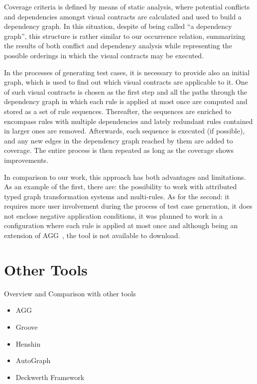 Coverage criteria is defined by means of static analysis, where potential conflicts and dependencies amongst visual contracts are calculated and used to build a dependency graph. In this situation, despite of being called ``a dependency graph'', this structure is rather similar to our occurrence relation, summarizing the results of both conflict and dependency analysis while representing the possible orderings in which the visual contracts may be executed.

In the processes of generating test cases, it is necessary to provide also an initial graph, which is used to find out which visual contracts are applicable to it. One of such visual contracts is chosen as the first step and all the paths through the dependency graph in which each rule is applied at most once are computed and stored as a set of rule sequences. Thereafter, the sequences are enriched to encompass rules with multiple dependencies and lately redundant rules contained in larger ones are
removed. Afterwards, each sequence is executed (if possible), and any new edges in the dependency graph reached by them are added to coverage. The entire process is then repeated as long as the coverage shows improvements. 

In comparison to our work, this approach has both advantages and limitations. As an example of the first, there are: the possibility to work with attributed typed graph transformation systems and multi-rules. As for the second: it requires more user involvement during the process of test case generation, it does not enclose negative application conditions, it was planned to work in a configuration where each rule is applied at most once and although being an extension of
AGG~\cite{Taentzer2000}, the tool is not available to download.

\section{Other Tools}

Overview and Comparison with other tools

\begin{itemize}
\item AGG
\item Groove
\item Henshin
\item AutoGraph
\item Deckwerth Framework
\end{itemize}

